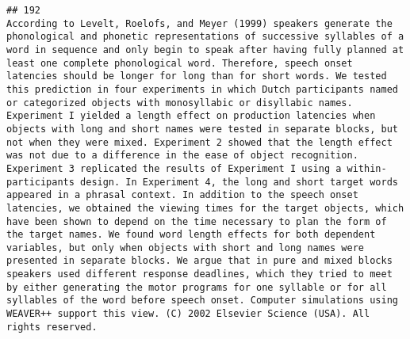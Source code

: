 \documentclass[
  english,
  man]{apa6}
\begin{document}
\begin{verbatim}
## 192                                                                                                                                                                                                                                                                                                                                                                                                                                                                                                                                                                                                                                                                                                                                                                                                                                                                                                                                                                                                                                          According to Levelt, Roelofs, and Meyer (1999) speakers generate the phonological and phonetic representations of successive syllables of a word in sequence and only begin to speak after having fully planned at least one complete phonological word. Therefore, speech onset latencies should be longer for long than for short words. We tested this prediction in four experiments in which Dutch participants named or categorized objects with monosyllabic or disyllabic names. Experiment I yielded a length effect on production latencies when objects with long and short names were tested in separate blocks, but not when they were mixed. Experiment 2 showed that the length effect was not due to a difference in the ease of object recognition. Experiment 3 replicated the results of Experiment I using a within-participants design. In Experiment 4, the long and short target words appeared in a phrasal context. In addition to the speech onset latencies, we obtained the viewing times for the target objects, which have been shown to depend on the time necessary to plan the form of the target names. We found word length effects for both dependent variables, but only when objects with short and long names were presented in separate blocks. We argue that in pure and mixed blocks speakers used different response deadlines, which they tried to meet by either generating the motor programs for one syllable or for all syllables of the word before speech onset. Computer simulations using WEAVER++ support this view. (C) 2002 Elsevier Science (USA). All rights reserved.

\end{verbatim}
\end{document}
